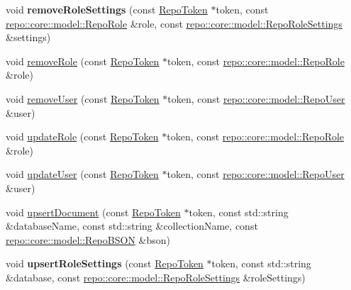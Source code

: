 \begin{DoxyCompactItemize}
\item 
\hypertarget{classrepo_1_1_repo_controller_a8f2e3ed9886e856b31ffeffac4a933e4}{}void {\bfseries remove\+Role\+Settings} (const \hyperlink{class_repo_controller_1_1_repo_token}{Repo\+Token} $\ast$token, const \hyperlink{classrepo_1_1core_1_1model_1_1_repo_role}{repo\+::core\+::model\+::\+Repo\+Role} \&role, const \hyperlink{classrepo_1_1core_1_1model_1_1_repo_role_settings}{repo\+::core\+::model\+::\+Repo\+Role\+Settings} \&settings)\label{classrepo_1_1_repo_controller_a8f2e3ed9886e856b31ffeffac4a933e4}

\item 
void \hyperlink{classrepo_1_1_repo_controller_ab5eb9a2c738b749edfc23798b8db195f}{remove\+Role} (const \hyperlink{class_repo_controller_1_1_repo_token}{Repo\+Token} $\ast$token, const \hyperlink{classrepo_1_1core_1_1model_1_1_repo_role}{repo\+::core\+::model\+::\+Repo\+Role} \&role)
\item 
void \hyperlink{classrepo_1_1_repo_controller_a61120f84152437486079cbc4e8ff5567}{remove\+User} (const \hyperlink{class_repo_controller_1_1_repo_token}{Repo\+Token} $\ast$token, const \hyperlink{classrepo_1_1core_1_1model_1_1_repo_user}{repo\+::core\+::model\+::\+Repo\+User} \&user)
\item 
void \hyperlink{classrepo_1_1_repo_controller_a58f21e84ece65d7c519aa761fb843e6c}{update\+Role} (const \hyperlink{class_repo_controller_1_1_repo_token}{Repo\+Token} $\ast$token, const \hyperlink{classrepo_1_1core_1_1model_1_1_repo_role}{repo\+::core\+::model\+::\+Repo\+Role} \&role)
\item 
void \hyperlink{classrepo_1_1_repo_controller_a4bcb288abd184808259438c5f323c757}{update\+User} (const \hyperlink{class_repo_controller_1_1_repo_token}{Repo\+Token} $\ast$token, const \hyperlink{classrepo_1_1core_1_1model_1_1_repo_user}{repo\+::core\+::model\+::\+Repo\+User} \&user)
\item 
void \hyperlink{classrepo_1_1_repo_controller_a4408454619486503fc6f760242e39355}{upsert\+Document} (const \hyperlink{class_repo_controller_1_1_repo_token}{Repo\+Token} $\ast$token, const std\+::string \&database\+Name, const std\+::string \&collection\+Name, const \hyperlink{classrepo_1_1core_1_1model_1_1_repo_b_s_o_n}{repo\+::core\+::model\+::\+Repo\+B\+S\+O\+N} \&bson)
\item 
\hypertarget{classrepo_1_1_repo_controller_a927884921c4875d5589af14babcceee2}{}void {\bfseries upsert\+Role\+Settings} (const \hyperlink{class_repo_controller_1_1_repo_token}{Repo\+Token} $\ast$token, const std\+::string \&database, const \hyperlink{classrepo_1_1core_1_1model_1_1_repo_role_settings}{repo\+::core\+::model\+::\+Repo\+Role\+Settings} \&role\+Settings)\label{classrepo_1_1_repo_controller_a927884921c4875d5589af14babcceee2}


\end{DoxyCompactItemize}
